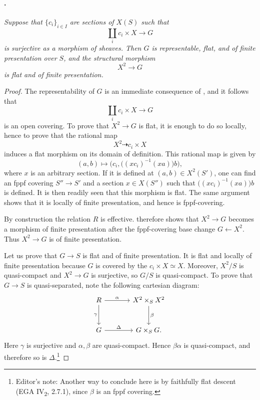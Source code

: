 \paragraph{.}
\textit{Suppose that \(\{c_i\}_{i\in I}\) are sections of
\(X(S)\) such that
\[
  \coprod_i c_i\times X\longrightarrow G
\]
is surjective as a morphism of sheaves. Then \(G\) is
representable, flat, and of finite presentation over \(S\), and
the structural morphism
\[
  X^2\longrightarrow G
\]
is flat and of finite presentation.}

\begin{proof}
The representability of \(G\) is an immediate consequence of
, and it follows that
\[
  \coprod_i c_i\times X\longrightarrow G
\]
is an open covering. To prove that \(X^2\to G\) is flat, it is
enough to do so locally, hence to prove that the rational map
\[
  X^2\dashrightarrow c_i\times X
\]
induces a flat morphism on its domain of definition. This rational
map is given by
\[
  (a,b)\longmapsto
  \bigl(c_i,\bigl((xc_i)^{-1}(xa)\bigr)b\bigr),
\]
where \(x\) is an arbitrary section. If it is defined at
\((a,b)\in X^2(S')\), one can find an fppf covering
\(S''\to S'\) and a section \(x\in X(S'')\) such that
\(\bigl((xc_i)^{-1}(xa)\bigr)b\) is defined. It is then readily
seen that this morphism is flat. The same argument shows that it
is locally of finite presentation, and hence is fppf-covering.

By construction the relation \(R\) is effective. 
therefore shows that \(X^2\to G\) becomes a morphism of finite
presentation after the fppf-covering base change
\(G\leftarrow X^2\). Thus \(X^2\to G\) is of finite presentation.

Let us prove that \(G\to S\) is flat and of finite presentation.
It is flat and locally of finite presentation because \(G\) is
covered by the \(c_i\times X\simeq X\). Moreover, \(X^2/S\) is
quasi-compact and \(X^2\to G\) is surjective, so \(G/S\) is
quasi-compact. To prove that \(G\to S\) is quasi-separated, note
the following cartesian diagram:
\[
\begin{tikzcd}[column sep=large,row sep=large]
  R \arrow[r,"\alpha"] \arrow[d,"\gamma"'] &
  X^2\times_S X^2 \arrow[d,"\beta"]\\
  G \arrow[r,"\Delta"] & G\times_S G.
\end{tikzcd}


\]
Here \(\gamma\) is surjective and \(\alpha,\beta\) are
quasi-compact. Hence \(\beta\alpha\) is quasi-compact, and
therefore so is \(\Delta\).\footnote{Editor's note: Another way
to conclude here is by faithfully flat descent
\textup{(EGA IV\textsubscript{2}, 2.7.1)}, since \(\beta\) is an
fppf covering.}
\end{proof}

